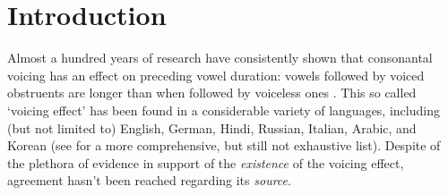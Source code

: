 \documentclass[preprint]{JASAnew}
\begin{document}

\maketitle




\section{Introduction}\label{introduction}

\label{s:intro}

Almost a hundred years of research have consistently shown that
consonantal voicing has an effect on preceding vowel duration: vowels
followed by voiced obstruents are longer than when followed by voiceless
ones
\citep{meyer1904, heffner1937, house1953, belasco1953, peterson1960, halle1967, chen1970, klatt1973, lisker1974, raphael1975, javkin1976, maddieson1976, farnetani1986, kluender1988, laeufer1992, fowler1992, hussein1994, esposito2002, lampp2004, warren2005, durvasula2012}.
This so called `voicing effect' has been found in a considerable variety
of languages, including (but not limited to) English, German, Hindi,
Russian, Italian, Arabic, and Korean (see \citealt{maddieson1976} for a
more comprehensive, but still not exhaustive list). Despite of the
plethora of evidence in support of the \emph{existence} of the voicing
effect, agreement hasn't been reached regarding its \emph{source}.
\end{document}
